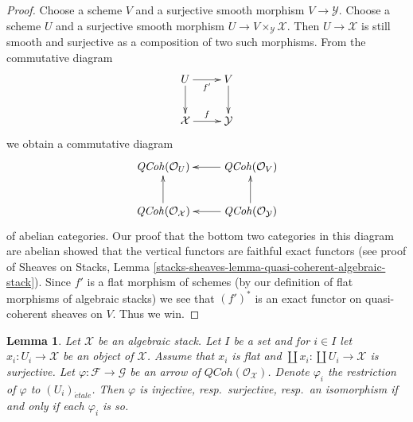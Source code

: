 \documentclass{stacks-project}
\theoremstyle{plain}
\newtheorem{lemma}[subsection]{Lemma}
\theoremstyle{definition}
\theoremstyle{remark}
\numberwithin{equation}{subsection}
\def\etale{{\acute{e}tale}}
\def\QCoh{\mathit{QCoh}}
\begin{document}
\begin{proof}
Choose a scheme $V$ and a surjective smooth morphism $V \to \mathcal{Y}$.
Choose a scheme $U$ and a surjective smooth morphism
$U \to V \times_\mathcal{Y} \mathcal{X}$. Then $U \to \mathcal{X}$ is
still smooth and surjective as a composition of two such morphisms.
From the commutative diagram
$$
\xymatrix{
U \ar[d] \ar[r]_{f'} & V \ar[d] \\
\mathcal{X} \ar[r]^f & \mathcal{Y}
}
$$
we obtain a commutative diagram
$$
\xymatrix{
\QCoh(\mathcal{O}_U) & \QCoh(\mathcal{O}_V) \ar[l] \\
\QCoh(\mathcal{O}_\mathcal{X}) \ar[u] &
\QCoh(\mathcal{O}_\mathcal{Y}) \ar[l] \ar[u]
}
$$
of abelian categories. Our proof that the bottom two categories in this
diagram are abelian showed that the vertical functors are faithful
exact functors (see proof of
Sheaves on Stacks, Lemma
\ref{stacks-sheaves-lemma-quasi-coherent-algebraic-stack}).
Since $f'$ is a flat morphism of schemes (by our definition of
flat morphisms of algebraic stacks) we see that $(f')^*$ is an
exact functor on quasi-coherent sheaves on $V$. Thus we win.
\end{proof}

\begin{lemma}
\label{lemma-quasi-coherent-check-exact}
Let $\mathcal{X}$ be an algebraic stack. Let $I$ be a set and
for $i \in I$ let $x_i : U_i \to \mathcal{X}$ be an object
of $\mathcal{X}$. Assume that $x_i$ is flat and
$\coprod x_i : \coprod U_i \to \mathcal{X}$ is surjective.
Let $\varphi : \mathcal{F} \to \mathcal{G}$ be an arrow of
$\QCoh(\mathcal{O}_\mathcal{X})$. Denote $\varphi_i$
the restriction of $\varphi$ to $(U_i)_\etale$.
Then $\varphi$ is injective, resp.\ surjective, resp.\ an isomorphism
if and only if each $\varphi_i$ is so.
\end{lemma}
\end{document}
